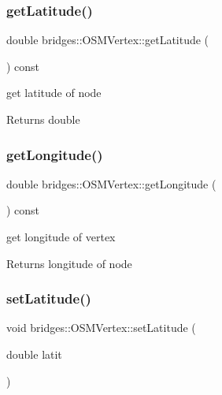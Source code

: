\subsubsection{\texorpdfstring{get\+Latitude()}{getLatitude()}}
{\footnotesize\ttfamily double bridges\+::\+O\+S\+M\+Vertex\+::get\+Latitude (\begin{DoxyParamCaption}{ }\end{DoxyParamCaption}) const\hspace{0.3cm}{\ttfamily [inline]}}

get latitude of node

\begin{DoxyReturn}{Returns}
double 
\end{DoxyReturn}
\mbox{\label{classbridges_1_1_o_s_m_vertex_a90d51ece713519a272e4224171b30b34}} 
\subsubsection{\texorpdfstring{get\+Longitude()}{getLongitude()}}
{\footnotesize\ttfamily double bridges\+::\+O\+S\+M\+Vertex\+::get\+Longitude (\begin{DoxyParamCaption}{ }\end{DoxyParamCaption}) const\hspace{0.3cm}{\ttfamily [inline]}}

get longitude of vertex

\begin{DoxyReturn}{Returns}
longitude of node 
\end{DoxyReturn}
\mbox{\label{classbridges_1_1_o_s_m_vertex_a8011165f0932b3b69cf303b41b2d55a1}} 
\subsubsection{\texorpdfstring{set\+Latitude()}{setLatitude()}}
{\footnotesize\ttfamily void bridges\+::\+O\+S\+M\+Vertex\+::set\+Latitude (\begin{DoxyParamCaption}\item[{double}]{latit }\end{DoxyParamCaption})\hspace{0.3cm}{\ttfamily [inline]}}

